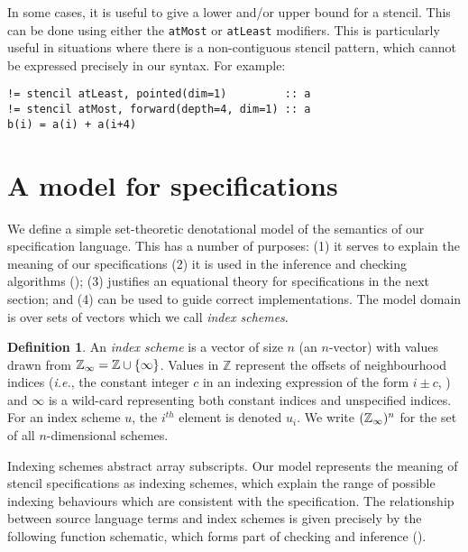 \documentclass[10pt,preprint]{sigplanconf}
\newcounter{block}
\theoremstyle{definition}
\newtheorem{definition}[block]{Definition}
\newcommand{\ie}{\emph{i.e.}}
\newcommand{\term}[1]{\texttt{#1}}
\begin{document}
In some cases, it is useful to give a lower and/or upper bound for a
stencil. This can be done using either the \term{atMost} or
\term{atLeast} modifiers. This is particularly useful in situations
where there is a non-contiguous stencil pattern, which cannot be expressed
precisely in our syntax. For example:
%
\begin{verbatim}
!= stencil atLeast, pointed(dim=1)         :: a
!= stencil atMost, forward(depth=4, dim=1) :: a
b(i) = a(i) + a(i+4)
\end{verbatim}

\section{A model for specifications}
\label{sec:semantics}

We define a simple set-theoretic denotational model of the semantics
of our specification language. This has a number of purposes:
(1) it serves to explain the meaning of our specifications
(2) it is used in the inference and checking algorithms
(); (3) justifies an equational theory for
specifications in the next section; and (4) can be used to guide
correct implementations. The model domain is over sets of vectors
which we call \emph{index schemes}.

\begin{definition}
  An \emph{index scheme} is a vector of size $n$ (an $n$-vector) with
  values drawn from $\mathbb{Z}_\infty = \mathbb{Z} \cup \{\infty\}$.  Values
  in $\mathbb{Z}$ represent the offsets of neighbourhood indices
  (\ie{}, the constant integer $c$ in an indexing expression of the
  form $i \pm c$, ) and $\infty$ is a wild-card
  representing both constant indices and unspecified indices.
  For an index scheme $u$, the $i^{th}$ element is denoted $u_i$. We
  write $(\mathbb{Z}_\infty)^n$ for the set of all $n$-dimensional schemes.
\end{definition}

Indexing schemes abstract array subscripts.
Our model represents the meaning of stencil specifications
as indexing schemes, which explain the range of possible
indexing behaviours which are consistent with the specification.
The relationship between source language
terms and index schemes
 is given precisely by the following function \textsf{schematic},
 which forms part of checking and inference ().
\end{document}
